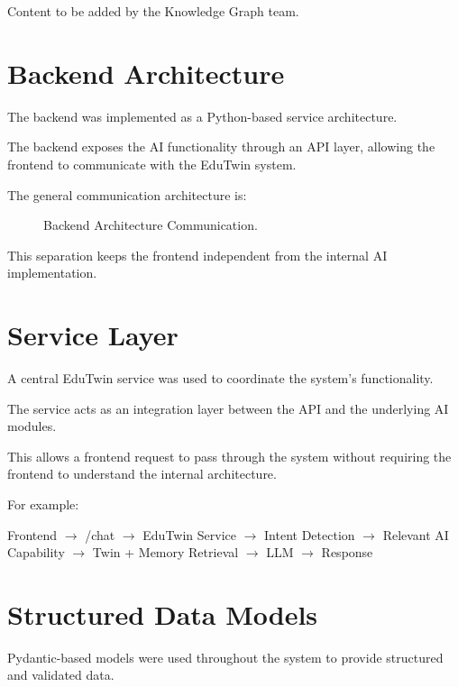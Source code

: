 \documentclass[12pt,a4paper]{article}
\begin{document}
Content to be added by the Knowledge Graph team.

\section{Backend Architecture}
The backend was implemented as a Python-based service architecture.

The backend exposes the AI functionality through an API layer, allowing the frontend to communicate with the EduTwin system.

The general communication architecture is:
\begin{figure}[htbp]
\centering
{}
\caption{Backend Architecture Communication.}
\end{figure}

This separation keeps the frontend independent from the internal AI implementation.

\section{Service Layer}
A central EduTwin service was used to coordinate the system's functionality.

The service acts as an integration layer between the API and the underlying AI modules.

This allows a frontend request to pass through the system without requiring the frontend to understand the internal architecture.

For example:
\begin{center}
Frontend $\rightarrow$ /chat $\rightarrow$ EduTwin Service $\rightarrow$ Intent Detection $\rightarrow$ Relevant AI Capability $\rightarrow$ Twin + Memory Retrieval $\rightarrow$ LLM $\rightarrow$ Response
\end{center}

\section{Structured Data Models}
Pydantic-based models were used throughout the system to provide structured and validated data.
\end{document}
